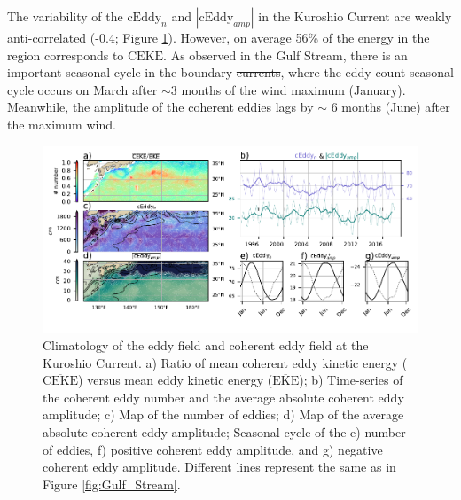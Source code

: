 \documentclass[draft,linenumbers]{agujournal2019}
\newcommand{\MEKE}{\overline{\textrm{EKE}}}
\newcommand{\MCEKE}{\overline{\textrm{CEKE}}}
\newcommand{\CEKE}{\textrm{CEKE}}
\newcommand{\cEddy}{\textrm{cEddy}}
\providecommand{\DIFadd}[1]{{\protect\color{blue}\uwave{#1}}} %
\providecommand{\DIFdel}[1]{{\protect\color{red}\sout{#1}}}                      %
\providecommand{\DIFaddbegin}{} %
\providecommand{\DIFaddend}{} %
\providecommand{\DIFdelbegin}{} %
\providecommand{\DIFdelend}{} %
\providecommand{\DIFaddFL}[1]{\DIFadd{#1}} %
\providecommand{\DIFdelFL}[1]{\DIFdel{#1}} %
\providecommand{\DIFaddbeginFL}{} %
\providecommand{\DIFaddendFL}{} %
\providecommand{\DIFdelbeginFL}{} %
\providecommand{\DIFdelendFL}{} %
\begin{document}
	The variability of the $\cEddy_{n}$ and $|\cEddy_{amp}|$ in the Kuroshio Current are weakly anti-correlated (-0.4; Figure \ref{fig:Kuroshio}). 
	However, on average 56\% of the energy in the region corresponds to $\CEKE$.
	As observed in the Gulf Stream, there is an important seasonal cycle in the boundary \DIFdelbegin \DIFdel{currents}\DIFdelend \DIFaddbegin \DIFadd{extensions}\DIFaddend , where the eddy count seasonal cycle occurs on March after $\sim$3 months of the wind maximum (January). Meanwhile, the amplitude of the coherent eddies lags by $\sim$ 6 months (June) after the maximum wind. 

	\begin{figure}
	    \centering
	    \includegraphics[width=1\textwidth]{figures/regional_ratios_and_stats_V3_4.pdf}
	    \caption{Climatology of the eddy field and coherent eddy field at the Kuroshio \DIFdelbeginFL \DIFdelFL{Current}\DIFdelendFL \DIFaddbeginFL \DIFaddFL{extension}\DIFaddendFL . a) Ratio of mean coherent eddy kinetic energy ($\MCEKE$) versus mean eddy kinetic energy ($\MEKE$); b) Time-series of the coherent eddy number and the average absolute coherent eddy amplitude; c) Map of the number of eddies; d) Map of the average absolute coherent eddy amplitude; Seasonal cycle of the e) number of eddies, f) positive coherent eddy amplitude, and g) negative coherent eddy amplitude. Different lines represent the same as in Figure \ref{fig:Gulf_Stream}.}
	    \label{fig:Kuroshio}
	\end{figure}
\end{document}
